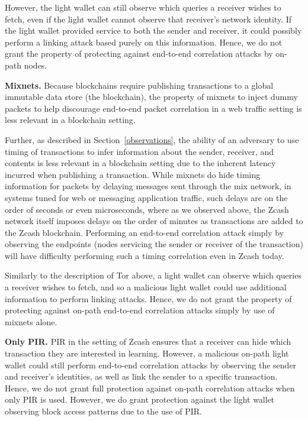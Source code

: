 \documentclass{article}
\begin{document}
However, the light wallet can still observe which queries a receiver wishes to
fetch, even if the light wallet cannot observe that receiver's network
identity. If the light wallet provided service to both the sender and receiver,
it could possibly perform a linking attack based purely on this information.
Hence, we do not grant the property of protecting against end-to-end
correlation attacks by on-path nodes.

\textbf{Mixnets.}
Because blockchains require publishing transactions to a global immutable data
store (the blockchain), the property of mixnets to inject dummy packets to help
discourage end-to-end packet correlation in a web traffic setting is less
relevant in a blockchain setting.

Further, as described in Section~\ref{observations}, the ability of an adversary to use timing of
transactions to infer information about the sender, receiver, and
contents is less relevant in a blockchain setting due to the inherent latency
incurred when publishing a transaction.
While mixnets do hide timing information for packets by
delaying messages sent through the mix network, in systems tuned for web or
messaging application traffic, such
delays are on the order of seconds or even microseconds, where as we observed
above, the Zcash network itself imposes delays on the order of minutes as
transactions are added to the Zcash blockchain. Performing an end-to-end
correlation attack simply by observing the endpoints (nodes servicing the
sender or receiver of the transaction) will have difficulty performing such a
timing correlation even in Zcash today.

Similarly to the description of Tor above, a light wallet can observe which
queries a receiver wishes to fetch, and so a malicious light wallet could use
additional information to perform linking attacks. Hence, we do not grant the
property of protecting against on-path end-to-end correlation attacks simply by
use of mixnets alone.

\textbf{Only PIR.}
PIR in the setting of Zcash ensures that a receiver can hide which transaction
they are interested in learning. However, a malicious on-path light wallet
could still perform end-to-end correlation attacks by observing the sender and
receiver's identities, as well as link the sender to a specific transaction.
Hence, we do not grant full protection against on-path correlation attacks when
only PIR is used. However, we do grant protection against the light wallet
observing block access patterns due to the use of PIR.
\end{document}
